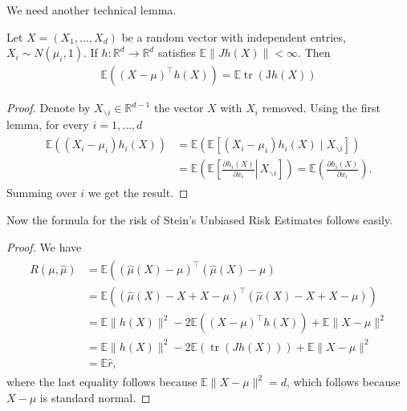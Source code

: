 We need another technical lemma.
\begin{lem}
    Let $X=\left(X_1, \ldots, X_d\right)$ be a random vector with independent entries, $X_i \sim N\left(\mu_i, 1\right)$. If $h: \mathbb{R}^d \rightarrow \mathbb{R}^d$ satisfies $\mathbb{E}\|J h(X)\|<\infty$. Then
\begin{align*}
\mathbb{E}\left((X-\mu)^{\top} h(X)\right)=\mathbb{E} \operatorname{tr}(\mathrm{J} h(X))
\end{align*}
\end{lem}


\begin{proof}
    Denote by $X_{\backslash i} \in \mathbb{R}^{d-1}$ the vector $X$ with $X_i$ removed. Using the first lemma, for every $i=1, \ldots, d$
\begin{align*}
\begin{aligned}
\mathbb{E}\left(\left(X_i-\mu_i\right) h_i(X)\right) & =\mathbb{E}\left(\mathbb{E}\left[\left(X_i-\mu_i\right) h_i(X) \mid X_{\backslash i}\right]\right) \\
& =\mathbb{E}\left(\mathbb{E}\left[\left.\frac{\partial h_i(X)}{\partial x_i} \right\rvert\, X_{\backslash i}\right]\right)=\mathbb{E}\left(\frac{\partial h_i(X)}{\partial x_i}\right) .
\end{aligned}
\end{align*}
Summing over $i$ we get the result.
\end{proof}

Now the formula for the risk of Stein's Unbiased Risk Estimates follows easily.

\begin{proof}
    We have
\begin{align*}
\begin{array}{ll}
R(\mu, \widehat{\mu}) & =\mathbb{E}\left((\widehat{\mu}(X)-\mu)^{\top}(\widehat{\mu}(X)-\mu)\right. \\
& =\mathbb{E}\left((\widehat{\mu}(X)-X+X-\mu)^{\top}(\widehat{\mu}(X)-X+X-\mu)\right) \\
& =\mathbb{E}\|h(X)\|^2-2 \mathbb{E}\left((X-\mu)^{\top} h(X)\right)+\mathbb{E}\|X-\mu\|^2 \\
& =\mathbb{E}\|h(X)\|^2-2 \mathbb{E}(\operatorname{tr}(J h(X)))+\mathbb{E}\|X-\mu\|^2 \\
& =\mathbb{E} \hat{r},
\end{array}
\end{align*}
where the last equality follows because $\mathbb{E}\|X-\mu\|^2=d$, which follows because $X-\mu$ is standard normal.
\end{proof}


